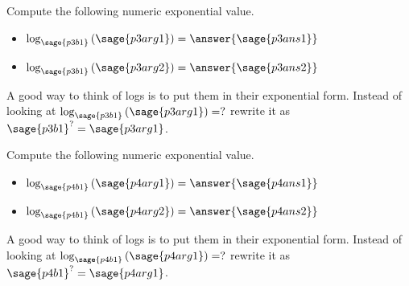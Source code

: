 \documentclass{ximera}
\begin{document}
\begin{problem}
    Compute the following numeric exponential value.
    
    \begin{itemize}
        \item $\log_{\sage{p3b1}}\left({\sage{p3arg1}}\right) = \answer{\sage{p3ans1}}$
        
        \item $\log_{\sage{p3b1}}\left({\sage{p3arg2}}\right) = \answer{\sage{p3ans2}}$
    \end{itemize}
    \begin{feedback}
        A good way to think of logs is to put them in their exponential form. Instead of looking at $\log_{\sage{p3b1}}\left({\sage{p3arg1}}\right) = ?$ rewrite it as $\sage{p3b1}^{?} = \sage{p3arg1}$.
    \end{feedback}

\end{problem}

\begin{problem}
    Compute the following numeric exponential value.
    
    \begin{itemize}
        \item $\log_{\sage{p4b1}}\left({\sage{p4arg1}}\right) = \answer{\sage{p4ans1}}$
        
        \item $\log_{\sage{p4b1}}\left({\sage{p4arg2}}\right) = \answer{\sage{p4ans2}}$
    \end{itemize}
    \begin{feedback}
        A good way to think of logs is to put them in their exponential form. Instead of looking at $\log_{\sage{p4b1}}\left({\sage{p4arg1}}\right) = ?$ rewrite it as $\sage{p4b1}^{?} = \sage{p4arg1}$.
    \end{feedback}

\end{problem}
\end{document}
